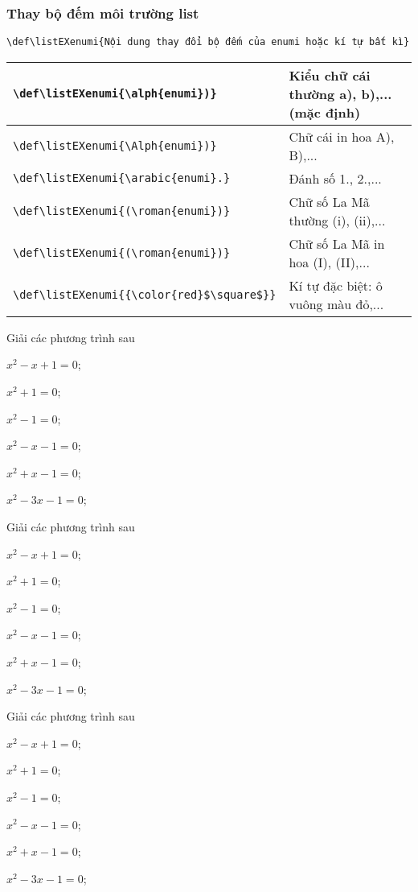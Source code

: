 \documentclass[12pt,a4paper,oneside]{article}
\begin{document}
\subsubsection{Thay bộ đếm môi trường list}
\begin{verbatim}
\def\listEXenumi{Nội dung thay đổi bộ đếm của enumi hoặc kí tự bất kì}
\end{verbatim}
\begin{center}
\begin{tabular}{|l|l|}
\hline 
 \verb+\def\listEXenumi{\alph{enumi})}+&Kiểu chữ cái thường a), b),... (mặc định) \\ 
\hline 
 \verb+\def\listEXenumi{\Alph{enumi})}+ & Chữ cái in hoa A), B),...\\ 
\hline 
 \verb+\def\listEXenumi{\arabic{enumi}.}+ & Đánh số 1., 2.,... \\ 
\hline 
 \verb+\def\listEXenumi{(\roman{enumi})}+ & Chữ số La Mã thường (i), (ii),... \\ 
\hline 
 \verb+\def\listEXenumi{(\roman{enumi})}+ & Chữ số La Mã in hoa (I), (II),... \\ 
\hline 
 \verb+\def\listEXenumi{{\color{red}$\square$}}+ & Kí tự đặc biệt: ô vuông màu đỏ,... \\ 
\hline 
\end{tabular} 
\end{center}
\def\listEXenumi{(\roman{enumi})}
\begin{ex}
Giải các phương trình sau
\begin{listEX}[3]
\item $x^2-x+1=0$;
\item $x^2+1=0$;
\item $x^2-1=0$;
\item $x^2-x-1=0$;
\item $x^2+x-1=0$;
\item $x^2-3x-1=0$;
\end{listEX}
\end{ex}
\def\listEXenumi{{\color{red}\checked}}
\begin{ex}
Giải các phương trình sau
\begin{listEX}[3]
\item $x^2-x+1=0$;
\item $x^2+1=0$;
\item $x^2-1=0$;
\item $x^2-x-1=0$;
\item $x^2+x-1=0$;
\item $x^2-3x-1=0$;
\end{listEX}
\end{ex}
\def\listEXenumi{{\color{red}$\square$}}
\begin{ex}
Giải các phương trình sau
\begin{listEX}[3]
\item $x^2-x+1=0$;
\item $x^2+1=0$;
\item $x^2-1=0$;
\item $x^2-x-1=0$;
\item $x^2+x-1=0$;
\item $x^2-3x-1=0$;
\end{listEX}
\end{ex}
\end{document}
